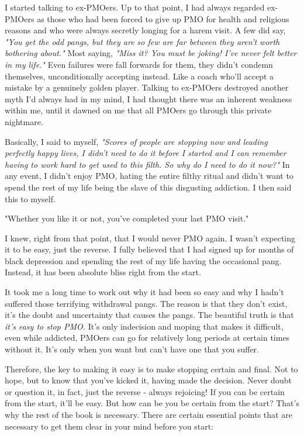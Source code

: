\documentclass[easypeasy]{subfiles}
\begin{document}
I started talking to ex-PMOers. Up to that point, I had always regarded ex-PMOers as those who had been forced to give up PMO for health and religious reasons and who were always secretly longing for a harem visit. A few did say, \textit{"You get the odd pangs, but they are so few are far between they aren't worth bothering about."} Most saying, \textit{"Miss it? You must be joking! I've never felt better in my life."} Even failures were fall forwards for them, they didn't condemn themselves, unconditionally accepting instead. Like a coach who'll accept a mistake by a genuinely golden player. Talking to ex-PMOers destroyed another myth I'd always had in my mind, I had thought there was an inherent weakness within me, until it dawned on me that all PMOers go through this private nightmare.

Basically, I said to myself, \textit{"Scores of people are stopping now and leading perfectly happy lives, I didn't need to do it before I started and I can remember having to work hard to get used to this filth. So why do I need to do it now?"} In any event, I didn't enjoy PMO, hating the entire filthy ritual and didn't want to spend the rest of my life being the slave of this disgusting addiction. I then said this to myself.

  {\Large "Whether you like it or not, you've completed your last PMO visit."}

I knew, right from that point, that I would never PMO again. I wasn't expecting it to be easy, just the reverse. I fully believed that I had signed up for months of black depression and spending the rest of my life having the occasional pang. Instead, it has been absolute bliss right from the start.

It took me a long time to work out why it had been so easy and why I hadn't suffered those terrifying withdrawal pangs. The reason is that they don't exist, it's the doubt and uncertainty that causes the pangs. The beautiful truth is that \textit{it's easy to stop PMO.} It's only indecision and moping that makes it difficult, even while addicted, PMOers can go for relatively long periods at certain times without it. It's only when you want but can't have one that you suffer.

Therefore, the key to making it easy is to make stopping certain and final. Not to hope, but to know that you've kicked it, having made the decision. Never doubt or question it, in fact, just the reverse - always rejoicing! If you can be certain from the start, it'll be easy. But how can be you be certain from the start? That's why the rest of the book is necessary. There are certain essential points that are necessary to get them clear in your mind before you start:
\end{document}
